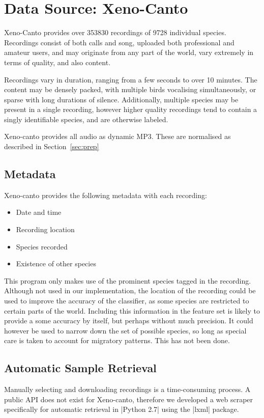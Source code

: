 \section{Data Source: Xeno-Canto}

Xeno-Canto \parencite{xenocanto} provides over 353830 recordings of 9728
individual species.
Recordings consist of both calls and song, uploaded both professional and
amateur users, and
may originate from any part of the world, vary extremely in
terms of quality, and also content.

Recordings vary in duration, ranging from a few seconds to over 10 minutes.
The content may be densely packed, with multiple birds vocalising simultaneously,
or sparse with long durations of silence.
Additionally, multiple species may be present in a single recording, however
higher quality recordings tend to contain a singly identifiable species, and
are otherwise labeled.

Xeno-canto provides all audio as dynamic MP3.
These are normalised as described in Section~\ref{sec:prep}

\subsection{Metadata}
Xeno-canto provides the following metadata with each recording:
\begin{itemize}[noitemsep]
  \item Date and time
  \item Recording location
  \item Species recorded
  \item Existence of other species
\end{itemize}

This program only makes use of the prominent species tagged in the recording.
Although not used in our implementation, the location of the recording could be
used to improve the accuracy of the classifier, as some species are restricted
to certain parts of the world.
Including this information in the feature set is likely to provide a
some accuracy by itself, but perhaps without much precision.
It could however be used to narrow down the set of possible species, so long as
special care is taken to account for migratory patterns.
This has not been done.

\subsection{Automatic Sample Retrieval}
Manually selecting and downloading recordings is a time-consuming process.
A public API does not exist for Xeno-canto, therefore we developed a web scraper
specifically for automatic retrieval in |Python 2.7| using the |lxml| package.

